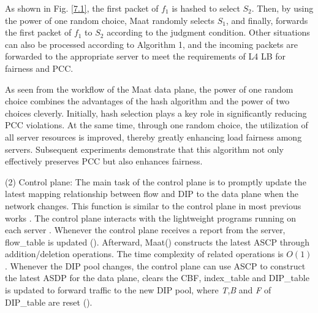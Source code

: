 {As shown in Fig. \ref{7.1}, the first packet of $f_1$ is hashed to select \emph{$S_2$}. Then, by using the power of one random choice, Maat randomly selects \emph{$S_1$}, and finally, forwards the first packet of $f_1$ to \emph{$S_2$} according to the judgment condition. Other situations can also be processed according to Algorithm 1, and the incoming packets are forwarded to the appropriate server to meet the requirements of L4 LB for fairness and PCC.

As seen from the workflow of the Maat data plane, the power of one random choice combines the advantages of the hash algorithm and the power of two choices cleverly. Initially, hash selection plays a key role in significantly reducing PCC violations. At the same time, through one random choice, the utilization of all server resources is improved, thereby greatly enhancing load fairness among servers. Subsequent experiments demonstrate that this algorithm not only effectively preserves PCC but also enhances fairness.

(2) Control plane: The main task of the control plane is to promptly update the latest mapping relationship between flow and DIP to the data plane when the network changes. This function is similar to the control plane in most previous works \cite{miao2017silkroad, eisenbud2016maglev, zhang2021loom}.  The control plane interacts with the lightweight programs running on each server \cite{gandhi2014duet}. Whenever the control plane receives a report from the server, flow_table is updated (). Afterward, Maat() constructs the latest ASCP through addition/deletion operations. The time complexity of related operations is \emph{$O(1)$} \cite{yu2018memory}. Whenever the DIP pool changes, the control plane can use ASCP to construct the latest ASDP for the data plane, clears the CBF, index\_table and DIP\_table is updated to forward traffic to the new DIP pool, where \emph{T},\emph{B} and \emph{F} of DIP_table are reset ().


}
